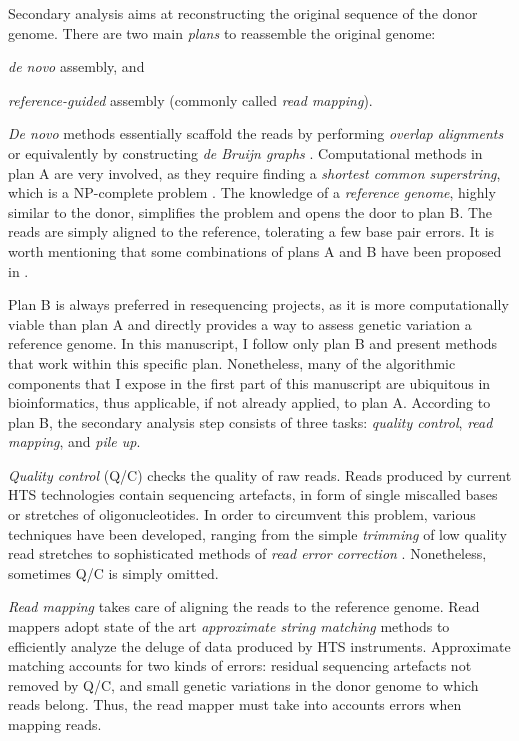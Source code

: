 Secondary analysis aims at reconstructing the original sequence of the donor genome.
There are two main \emph{plans} to reassemble the original genome: \begin{inparaenum}[(A)]
\item \emph{de novo} assembly, and
\item \emph{reference-guided} assembly (commonly called \emph{read mapping}).
\end{inparaenum}
\emph{De novo} methods essentially scaffold the reads by performing \emph{overlap alignments} \citep{?} or equivalently by constructing \emph{de Bruijn graphs} \citep{?}.
Computational methods in plan A are very involved, as they require finding a \emph{shortest common superstring}, which is a NP-complete problem \citep{?}.
The knowledge of a \emph{reference genome}, highly similar to the donor, simplifies the problem and opens the door to plan B.
The reads are simply aligned to the reference, tolerating a few base pair errors.
It is worth mentioning that some combinations of plans A and B have been proposed in \citep{fermi,?}.

Plan B is always preferred in resequencing projects, as it is more computationally viable than plan A and directly provides a way to assess genetic variation \wrt a reference genome.
In this manuscript, I follow only plan B and present methods that work within this specific plan.
Nonetheless, many of the algorithmic components that I expose in the first part of this manuscript are ubiquitous in bioinformatics, thus applicable, if not already applied, to plan A.
According to plan B, the secondary analysis step consists of three tasks: \emph{quality control}, \emph{read mapping}, and \emph{pile up}.

\emph{Quality control} (Q/C) checks the quality of raw reads.
Reads produced by current HTS technologies contain sequencing artefacts, in form of single miscalled bases or stretches of oligonucleotides.
In order to circumvent this problem, various techniques have been developed, ranging from the simple \emph{trimming} of low quality read stretches to sophisticated methods of \emph{read error correction} \citep{fiona}.
Nonetheless, sometimes Q/C is simply omitted.

\emph{Read mapping} takes care of aligning the reads to the reference genome.
Read mappers adopt state of the art \emph{approximate string matching} methods to efficiently analyze the deluge of data produced by HTS instruments.
Approximate matching accounts for two kinds of errors:
residual sequencing artefacts not removed by Q/C, and small genetic variations in the donor genome to which reads belong.
Thus, the read mapper must take into accounts errors when mapping reads.

